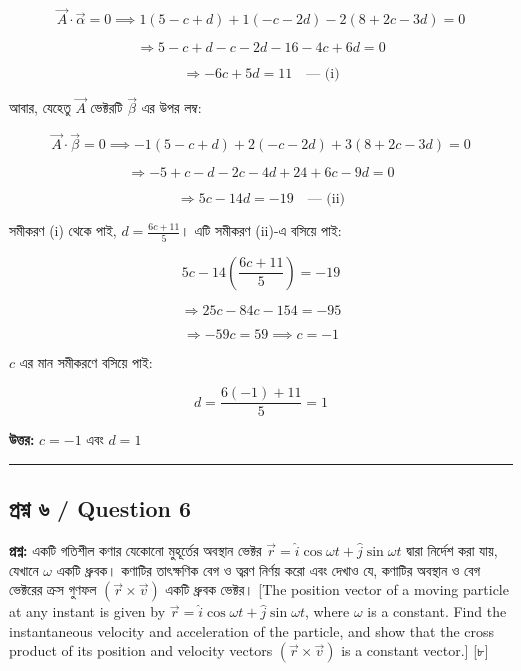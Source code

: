 \documentclass[11pt, a4paper]{article}
\begin{document}
$$\vec{A} \cdot \vec{\alpha} = 0 \implies 1(5 - c + d) + 1(-c - 2d) - 2(8 + 2c - 3d) = 0$$

$$\Rightarrow 5 - c + d - c - 2d - 16 - 4c + 6d = 0$$

$$\Rightarrow -6c + 5d = 11 \quad \text{--- (i)}$$

আবার, যেহেতু $\vec{A}$ ভেক্টরটি $\vec{\beta}$ এর উপর লম্ব:

$$\vec{A} \cdot \vec{\beta} = 0 \implies -1(5 - c + d) + 2(-c - 2d) + 3(8 + 2c - 3d) = 0$$

$$\Rightarrow -5 + c - d - 2c - 4d + 24 + 6c - 9d = 0$$

$$\Rightarrow 5c - 14d = -19 \quad \text{--- (ii)}$$

সমীকরণ (i) থেকে পাই, $d = \frac{6c + 11}{5}$। এটি সমীকরণ (ii)-এ বসিয়ে পাই:

$$5c - 14\left(\frac{6c + 11}{5}\right) = -19$$

$$\Rightarrow 25c - 84c - 154 = -95$$

$$\Rightarrow -59c = 59 \implies c = -1$$

$c$ এর মান সমীকরণে বসিয়ে পাই:

$$d = \frac{6(-1) + 11}{5} = 1$$

\textbf{উত্তর:} $c = -1$ এবং $d = 1$

\vspace{1em}
\begin{center}
\end{center}

\vspace{1em}
\noindent\rule{\textwidth}{0.4pt}
\vspace{1em}

\subsection*{প্রশ্ন ৬ / Question 6}
\textbf{প্রশ্ন:} একটি গতিশীল কণার যেকোনো মুহূর্তের অবস্থান ভেক্টর $\vec{r} = \hat{i}\cos\omega t + \hat{j}\sin\omega t$ দ্বারা নির্দেশ করা যায়, যেখানে $\omega$ একটি ধ্রুবক। কণাটির তাৎক্ষণিক বেগ ও ত্বরণ নির্ণয় করো এবং দেখাও যে, কণাটির অবস্থান ও বেগ ভেক্টরের ক্রস গুণফল $(\vec{r} \times \vec{v})$ একটি ধ্রুবক ভেক্টর। [The position vector of a moving particle at any instant is given by $\vec{r} = \hat{i}\cos\omega t + \hat{j}\sin\omega t$, where $\omega$ is a constant. Find the instantaneous velocity and acceleration of the particle, and show that the cross product of its position and velocity vectors $(\vec{r} \times \vec{v})$ is a constant vector.] [৮]
\end{document}
